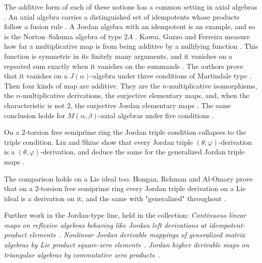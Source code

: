 The additive form of each of these notions has a common setting in axial
algebras \cite[p.~1]{KawaiGuzzoFerreira2025}. An axial algebra carries a
distinguished set of idempotents whose products follow a fusion rule
\cite[Definition~2.3, p.~5]{KawaiGuzzoFerreira2025}. A Jordan algebra with an
idempotent is an example, and so is the Norton--Sakuma algebra of type $2A$
\cite[Example~4.2, p.~8]{KawaiGuzzoFerreira2025}. Kawai, Guzzo and Ferreira
measure how far a multiplicative map is from being additive by a nullifying
function \cite[Definition~3.5, p.~6]{KawaiGuzzoFerreira2025}. This function is
symmetric in its finitely many arguments, and it vanishes on a repeated sum
exactly when it vanishes on the summands
\cite[Definition~3.5, p.~6]{KawaiGuzzoFerreira2025}. The authors prove that it
vanishes on a $J(\alpha)$-algebra under three conditions of Martindale type
\cite[Theorem~4.1, p.~8]{KawaiGuzzoFerreira2025}. Then four kinds of map are
additive. They are the $n$-multiplicative isomorphisms, the $n$-multiplicative
derivations, the surjective elementary maps, and, when the characteristic is not
$2$, the surjective Jordan elementary maps
\cite[Corollary~4.1, p.~10]{KawaiGuzzoFerreira2025}. The same conclusion holds
for $M(\alpha,\beta)$-axial algebras under five conditions
\cite[Theorem~5.1, p.~12]{KawaiGuzzoFerreira2025}.

On a $2$-torsion free semiprime ring the Jordan triple condition collapses to the
triple condition. Liu and Shiue show that every Jordan triple
$(\theta,\varphi)$-derivation is a $(\theta,\varphi)$-derivation, and deduce the
same for the generalized Jordan triple maps
\cite[Abstract]{LiuShiue2007JordanTriple}.

The comparison holds on a Lie ideal too. Hongan, Rehman and Al-Omary prove that on
a $2$-torsion free semiprime ring every Jordan triple derivation on a Lie ideal is
a derivation on it, and the same with "generalized" throughout
\cite[Abstract]{HonganRehmanAlOmary2011}.

Further work in the Jordan-type line, held in the collection:
\noindent\emph{Continuous linear maps on reflexive algebras behaving like Jordan left derivations at idempotent-product elements}~\cite{LibContinuousLinearMapsOn2013}.
\noindent\emph{Nonlinear Jordan derivable mappings of generalized matrix algebras by Lie product square-zero elements}~\cite{LibNonlinearJordanDerivableMappings2021}.
\noindent\emph{Jordan higher derivable maps on triangular algebras by commutative zero products}~\cite{LibJordanHigherDerivableMaps2016}.

